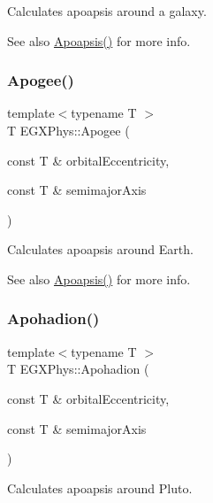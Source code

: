 Calculates apoapsis around a galaxy. 

\begin{DoxySeeAlso}{See also}
\hyperlink{group___e_g_x_phys-_apoapsis_gaf962e650bf84a568458e8eb39b1c61ba}{Apoapsis()} for more info. 
\end{DoxySeeAlso}
\mbox{\label{group___e_g_x_phys-_apoapsis_ga5cf587a051db28cae9e028a2b4955b0d}} 
\subsubsection{\texorpdfstring{Apogee()}{Apogee()}}
{\footnotesize\ttfamily template$<$typename T $>$ \\
T E\+G\+X\+Phys\+::\+Apogee (\begin{DoxyParamCaption}\item[{const T \&}]{orbital\+Eccentricity,  }\item[{const T \&}]{semimajor\+Axis }\end{DoxyParamCaption})}



Calculates apoapsis around Earth. 

\begin{DoxySeeAlso}{See also}
\hyperlink{group___e_g_x_phys-_apoapsis_gaf962e650bf84a568458e8eb39b1c61ba}{Apoapsis()} for more info. 
\end{DoxySeeAlso}
\mbox{\label{group___e_g_x_phys-_apoapsis_gaa16847ddc5763c327067075dcb6a3353}} 
\subsubsection{\texorpdfstring{Apohadion()}{Apohadion()}}
{\footnotesize\ttfamily template$<$typename T $>$ \\
T E\+G\+X\+Phys\+::\+Apohadion (\begin{DoxyParamCaption}\item[{const T \&}]{orbital\+Eccentricity,  }\item[{const T \&}]{semimajor\+Axis }\end{DoxyParamCaption})}



Calculates apoapsis around Pluto. 

